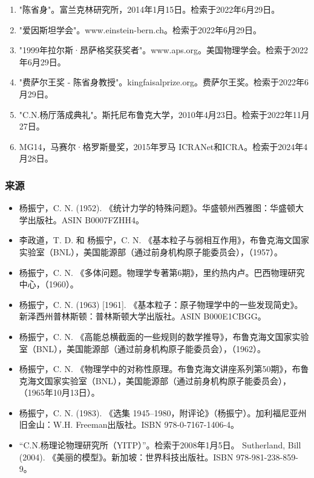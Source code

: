 \begin{enumerate}
\item "陈省身"。富兰克林研究所，2014年1月15日。检索于2022年6月29日。  
\item "爱因斯坦学会"。www.einstein-bern.ch。检索于2022年6月29日。  
\item "1999年拉尔斯·昂萨格奖获奖者"。www.aps.org。美国物理学会。检索于2022年6月29日。  
\item "费萨尔王奖 - 陈省身教授"。kingfaisalprize.org。费萨尔王奖。检索于2022年6月29日。  
\item "C.N.杨厅落成典礼"。斯托尼布鲁克大学，2010年4月23日。检索于2022年11月27日。  
\item MG14，马赛尔·格罗斯曼奖，2015年罗马 ICRANet和ICRA。检索于2024年4月28日。
\end{enumerate}
\subsubsection{来源}  
\begin{itemize}
\item 杨振宁，C. N. (1952). 《统计力学的特殊问题》。华盛顿州西雅图：华盛顿大学出版社。ASIN B0007FZHH4。  
\item 李政道，T. D. 和 杨振宁，C. N. 《基本粒子与弱相互作用》，布鲁克海文国家实验室（BNL），美国能源部（通过前身机构原子能委员会），（1957）。  
\item 杨振宁，C. N. 《多体问题。物理学专著第6期》，里约热内卢。巴西物理研究中心，（1960）。  
\item 杨振宁，C. N. (1963) [1961]. 《基本粒子：原子物理学中的一些发现简史》。新泽西州普林斯顿：普林斯顿大学出版社。ASIN B000E1CBGG。  
\item 杨振宁，C. N. 《高能总横截面的一些规则的数学推导》，布鲁克海文国家实验室（BNL），美国能源部（通过前身机构原子能委员会），（1962）。  
\item 杨振宁，C. N. 《物理学中的对称性原理。布鲁克海文讲座系列第50期》，布鲁克海文国家实验室（BNL），美国能源部（通过前身机构原子能委员会），（1965年10月13日）。  
\item 杨振宁，C. N. (1983). 《选集 1945–1980，附评论》（杨振宁）。加利福尼亚州旧金山：W.H. Freeman出版社。ISBN 978-0-7167-1406-4。  
\item “C.N.杨理论物理研究所（YITP）”。检索于2008年1月5日。  
Sutherland, Bill (2004). 《美丽的模型》。新加坡：世界科技出版社。ISBN 978-981-238-859-9。
\end{itemize}
